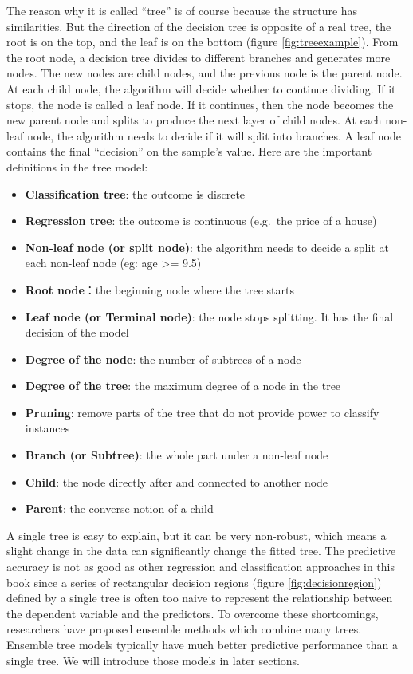 \documentclass[
  12pt,
]{krantz}
\providecommand{\tightlist}{%
  \setlength{\itemsep}{0pt}\setlength{\parskip}{0pt}}
\begin{document}
The reason why it is called ``tree'' is of course because the structure has similarities. But the direction of the decision tree is opposite of a real tree, the root is on the top, and the leaf is on the bottom (figure \ref{fig:treeexample}). From the root node, a decision tree divides to different branches and generates more nodes. The new nodes are child nodes, and the previous node is the parent node. At each child node, the algorithm will decide whether to continue dividing. If it stops, the node is called a leaf node. If it continues, then the node becomes the new parent node and splits to produce the next layer of child nodes. At each non-leaf node, the algorithm needs to decide if it will split into branches. A leaf node contains the final ``decision'' on the sample's value. Here are the important definitions in the tree model:

\begin{itemize}
\tightlist
\item
  \textbf{Classification tree}: the outcome is discrete
\item
  \textbf{Regression tree}: the outcome is continuous (e.g.~the price of a house)
\item
  \textbf{Non-leaf node (or split node)}: the algorithm needs to decide a split at each non-leaf node (eg: age \textgreater= 9.5)
\item
  \textbf{Root node}：the beginning node where the tree starts
\item
  \textbf{Leaf node (or Terminal node)}: the node stops splitting. It has the final decision of the model
\item
  \textbf{Degree of the node}: the number of subtrees of a node
\item
  \textbf{Degree of the tree}: the maximum degree of a node in the tree
\item
  \textbf{Pruning}: remove parts of the tree that do not provide power to classify instances
\item
  \textbf{Branch (or Subtree)}: the whole part under a non-leaf node
\item
  \textbf{Child}: the node directly after and connected to another node
\item
  \textbf{Parent}: the converse notion of a child
\end{itemize}

A single tree is easy to explain, but it can be very non-robust, which means a slight change in the data can significantly change the fitted tree. The predictive accuracy is not as good as other regression and classification approaches in this book since a series of rectangular decision regions (figure \ref{fig:decisionregion}) defined by a single tree is often too naive to represent the relationship between the dependent variable and the predictors. To overcome these shortcomings, researchers have proposed ensemble methods which combine many trees. Ensemble tree models typically have much better predictive performance than a single tree. We will introduce those models in later sections.
\end{document}
